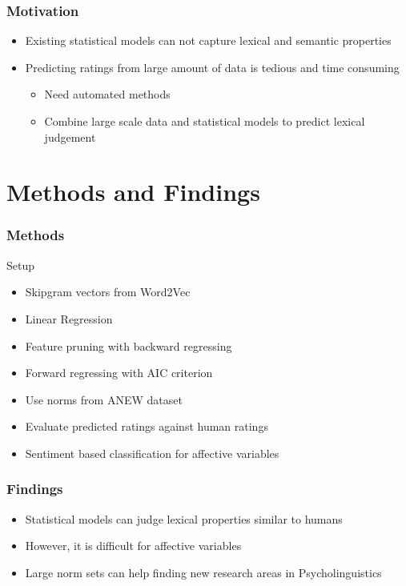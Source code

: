 \documentclass{beamer}
\begin{document}

\begin{frame}
\frametitle{Motivation}
\begin{itemize}
\item Existing statistical models can not capture lexical and semantic properties
\item Predicting ratings from large amount of data is tedious and time consuming
    \begin{itemize}
        \item Need automated methods
        \item Combine large scale data and statistical models to predict lexical judgement
    \end{itemize}
\end{itemize}
\end{frame}

\section{Methods and Findings}
\begin{frame}
\frametitle{Methods}
\begin{block}{Setup}
    \begin{itemize}
        \item Skipgram vectors from Word2Vec
        \item Linear Regression 
        \item Feature pruning with backward regressing
        \item Forward regressing with AIC criterion
        \item Use norms from ANEW dataset
        \item Evaluate predicted ratings against human ratings
        \item Sentiment based classification for affective variables
    \end{itemize}
\end{block}

\end{frame}


\begin{frame}
\frametitle{Findings}
\begin{itemize}
    \item Statistical models can judge lexical properties similar to humans
    \item However, it is difficult for affective variables
    \item Large norm sets can help finding new research areas in Psycholinguistics
\end{itemize}
\end{frame}
\end{document}
